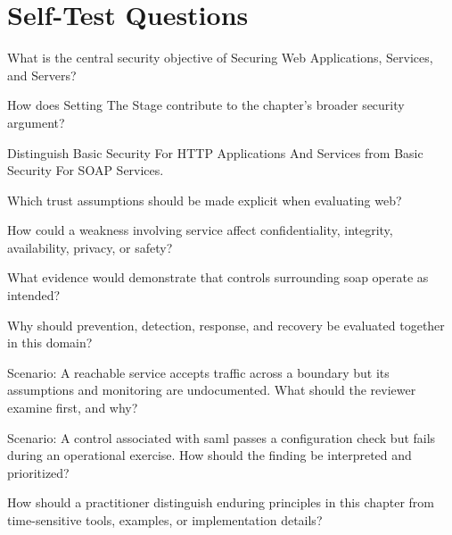 \documentclass[11pt,letterpaper]{article}
\begin{document}
\section*{Self-Test Questions}
\begin{CornellRecallList}
\item What is the central security objective of Securing Web Applications, Services, and Servers?
\item How does Setting The Stage contribute to the chapter's broader security argument?
\item Distinguish Basic Security For HTTP Applications And Services from Basic Security For SOAP Services.
\item Which trust assumptions should be made explicit when evaluating web?
\item How could a weakness involving service affect confidentiality, integrity, availability, privacy, or safety?
\item What evidence would demonstrate that controls surrounding soap operate as intended?
\item Why should prevention, detection, response, and recovery be evaluated together in this domain?
\item Scenario: A reachable service accepts traffic across a boundary but its assumptions and monitoring are undocumented. What should the reviewer examine first, and why?
\item Scenario: A control associated with saml passes a configuration check but fails during an operational exercise. How should the finding be interpreted and prioritized?
\item How should a practitioner distinguish enduring principles in this chapter from time-sensitive tools, examples, or implementation details?
\end{CornellRecallList}
\end{document}
